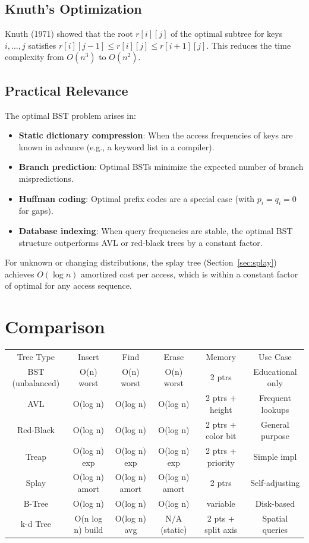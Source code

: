 \subsection{Knuth's Optimization}
\label{sec:optimal-bst-knuth}

Knuth (1971) showed that the root $r[i][j]$ of the optimal subtree for keys $i, \ldots, j$ satisfies $r[i][j-1] \leq r[i][j] \leq r[i+1][j]$. This reduces the time complexity from $O(n^3)$ to $O(n^2)$.

\subsection{Practical Relevance}
\label{sec:optimal-bst-relevance}

The optimal BST problem arises in:
\begin{itemize}
    \item \textbf{Static dictionary compression}: When the access frequencies of keys are known in advance (e.g., a keyword list in a compiler).
    \item \textbf{Branch prediction}: Optimal BSTs minimize the expected number of branch mispredictions.
    \item \textbf{Huffman coding}: Optimal prefix codes are a special case (with $p_i = q_i = 0$ for gaps).
    \item \textbf{Database indexing}: When query frequencies are stable, the optimal BST structure outperforms AVL or red-black trees by a constant factor.
\end{itemize}

For unknown or changing distributions, the splay tree (Section~\ref{sec:splay}) achieves $O(\log n)$ amortized cost per access, which is within a constant factor of optimal for any access sequence.

\section{Comparison}

\begin{center}
\begin{tabular}{cccccc}
\toprule
Tree Type & Insert & Find & Erase & Memory & Use Case \\
BST (unbalanced) & O(n) worst & O(n) worst & O(n) worst & 2 ptrs & Educational only \\
AVL & O(log n) & O(log n) & O(log n) & 2 ptrs + height & Frequent lookups \\
Red-Black & O(log n) & O(log n) & O(log n) & 2 ptrs + color bit & General purpose \\
Treap & O(log n) exp & O(log n) exp & O(log n) exp & 2 ptrs + priority & Simple impl \\
Splay & O(log n) amort & O(log n) amort & O(log n) amort & 2 ptrs & Self-adjusting \\
B-Tree & O(log n) & O(log n) & O(log n) & variable & Disk-based \\
k-d Tree & O(n log n) build & O(log n) avg & N/A (static) & 2 pts + split axis & Spatial queries \\

\bottomrule
\end{tabular}
\end{center}
